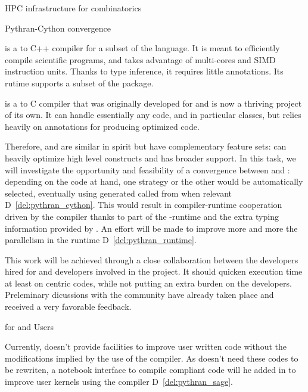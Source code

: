 \begin{Workpackage}{\thewpno}
\begin{task}{HPC infrastructure for combinatorics}
\end{task}

\begin{task}{Pythran-Cython convergence}
  \label{task:pythran_cython}

  \Pythran is a \Python to C++ compiler for a subset of the \Python
  language. It is meant to efficiently compile scientific programs,
  and takes advantage of multi-cores and SIMD instruction units.
  Thanks to type inference, it requires little annotations. Its rutime
  supports a subset of the \Numpy package.

  \Cython is a \Python to C compiler that was originally developed for
  \Sage and is now a thriving project of its own. It can handle
  essentially any \Python code, and in particular classes, but relies
  heavily on annotations for producing optimized code.

  Therefore, \Pythran and \Cython are similar in spirit but have
  complementary feature sets: \Pythran can heavily optimize high level
  \Numpy constructs and \Cython has broader \Python support. In this
  task, we will investigate the opportunity and feasibility of a
  convergence between \Cython and \Pythran: depending on the code at
  hand, one strategy or the other would be automatically selected,
  eventually using \Pythran generated called from \Cython when
  relevant D~\ref{del:pythran_cython}. This would result in compiler-runtime
  cooperation driven by the \Cython compiler thanks to part of the
  \Pythran-runtime and the extra typing information provided by \Cython. An
  effort will be made to improve more and more the parallelism in the
  \Pythran runtime D~\ref{del:pythran_runtime}.

  This work will be achieved through a close collaboration between the \Pythran
  developers hired for \TheProject and \Cython developers involved in the \Sage
  project. It should quicken \Sage execution time at least on \Numpy centric
  codes, while not putting an extra burden on the developers.  Preleminary
  dicussions with the \Cython community have already taken place and received a
  very favorable feedback.


\end{task}

\begin{task}{\Pythran for \Sage and \Sage Users}
  \label{task:pythran_sage}

  Currently, \Sage doesn't provide facilities to improve user written
  \Python code without the modifications implied by the use of the \Cython
  compiler. As \Pythran doesn't need these codes to be rewriten, a notebook
  interface to compile \Pythran compliant code will he added in \Sage to
  improve user kernels using the \Pythran compiler D~\ref{del:pythran_sage}.


\end{task}
\end{Workpackage}
